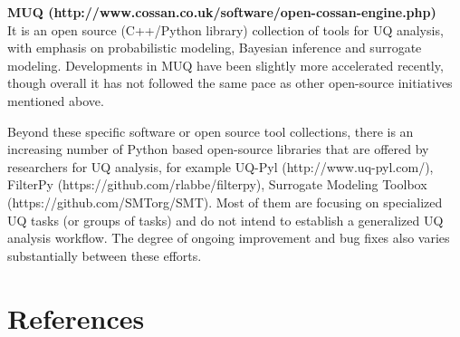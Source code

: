 \noindent\textbf{MUQ (http://www.cossan.co.uk/software/open-cossan-engine.php)} \\It is an open source (C++/Python library) collection of tools for UQ analysis, with emphasis on probabilistic modeling, Bayesian inference and surrogate modeling. Developments in MUQ have been slightly more accelerated recently, though overall it has not followed the same pace as other open-source initiatives mentioned above.

Beyond these specific software or open source tool collections, there is an increasing number of Python based open-source libraries that are offered by researchers for UQ analysis, for example UQ-Pyl (http://www.uq-pyl.com/), FilterPy (https://github.com/rlabbe/filterpy), Surrogate Modeling Toolbox (https://github.com/SMTorg/SMT). Most of them are focusing on specialized UQ tasks (or groups of tasks) and do not intend to establish a generalized UQ analysis workflow. The degree of ongoing improvement and bug fixes also varies substantially between these efforts. 

\section{References}
\label{sec:UQRef}

